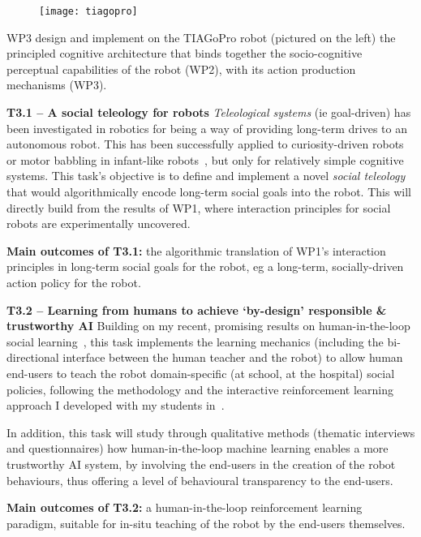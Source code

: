 \begin{rewrite}

\begin{figure}
    \centering
    \vspace{-10pt}
    \texttt{[image: tiagopro]}
    \label{fig:tiagopro}
\end{figure}

    WP3 design and implement on the TIAGoPro robot (pictured on the left) the principled cognitive architecture
that binds together the socio-cognitive perceptual capabilities of the robot
(WP2), with its action production mechanisms (WP3).

\textbf{T3.1 -- A social teleology for robots}
\emph{Teleological systems} (ie goal-driven) has been investigated in robotics
for being a way of providing long-term drives to an autonomous robot. This has
been successfully applied to curiosity-driven robots~\cite{oudeyer2005playground} or motor babbling in infant-like
robots~\cite{forestier2017unified}, but only for relatively simple cognitive
systems. This task's objective is to define and implement a novel \emph{social teleology} that would
algorithmically encode long-term social goals into the robot. This will directly
build from the results of WP1, where interaction principles for social robots
are experimentally uncovered.

\begin{framed}
    {\noindent\bf Main outcomes of T3.1:} the algorithmic translation of WP1's
    interaction principles in long-term social goals for the robot, eg a
    long-term, socially-driven action policy for the robot.
\end{framed}

\textbf{T3.2 -- Learning from humans to achieve `by-design' responsible \&
trustworthy AI}
Building on my recent, promising results on human-in-the-loop
social learning~\cite{senft2019teaching,winkle2020couch}, this task
implements the learning mechanics (including the bi-directional interface
between the human teacher and the robot) to allow human end-users to
teach the robot domain-specific (at school, at the hospital) social policies,
following the methodology and the interactive reinforcement learning approach I
developed with my students in~\cite{senft2017supervised}.

In addition, this task will study through qualitative methods (thematic
interviews and questionnaires) how human-in-the-loop machine learning enables a more
trustworthy AI system, by involving the end-users in the creation of the robot
behaviours, thus offering a level of behavioural transparency to the end-users.

\begin{framed}
    {\noindent\bf Main outcomes of T3.2:} a human-in-the-loop reinforcement
    learning paradigm, suitable for in-situ teaching of the robot by the
    end-users themselves.
\end{framed}

\end{rewrite}


